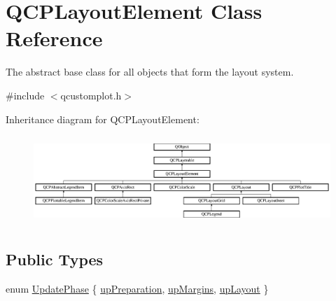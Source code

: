 \hypertarget{class_q_c_p_layout_element}{}\section{Q\+C\+P\+Layout\+Element Class Reference}
\label{class_q_c_p_layout_element}


The abstract base class for all objects that form the layout system.  




{\ttfamily \#include $<$qcustomplot.\+h$>$}

Inheritance diagram for Q\+C\+P\+Layout\+Element\+:\begin{figure}[H]
\begin{center}
\leavevmode
\includegraphics[height=3.376884cm]{class_q_c_p_layout_element}
\end{center}
\end{figure}
\subsection*{Public Types}
\begin{DoxyCompactItemize}
\item 
enum \hyperlink{class_q_c_p_layout_element_a0d83360e05735735aaf6d7983c56374d}{Update\+Phase} \{ \hyperlink{class_q_c_p_layout_element_a0d83360e05735735aaf6d7983c56374dad6119882eba136357c2f627992e527d3}{up\+Preparation}, 
\hyperlink{class_q_c_p_layout_element_a0d83360e05735735aaf6d7983c56374da288cb59a92280e47261a341f2813e676}{up\+Margins}, 
\hyperlink{class_q_c_p_layout_element_a0d83360e05735735aaf6d7983c56374da5d1ccf5d79967c232c3c511796860045}{up\+Layout}
 \}
\end{DoxyCompactItemize}
